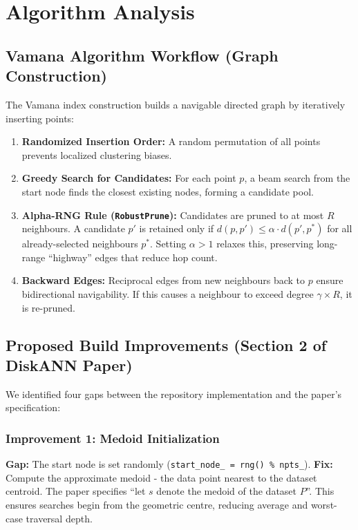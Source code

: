 \documentclass[10pt]{article}
\begin{document}
\section{Algorithm Analysis}

\subsection{Vamana Algorithm Workflow (Graph Construction)}

The Vamana index construction builds a navigable directed graph by iteratively inserting points:

\begin{enumerate}
    \item \textbf{Randomized Insertion Order:} A random permutation of all points prevents localized clustering biases.
    \item \textbf{Greedy Search for Candidates:} For each point $p$, a beam search from the start node finds the closest existing nodes, forming a candidate pool.
    \item \textbf{Alpha-RNG Rule (\texttt{RobustPrune}):} Candidates are pruned to at most $R$ neighbours. A candidate $p'$ is retained only if $d(p, p') \leq \alpha \cdot d(p', p^*)$ for all already-selected neighbours $p^*$. Setting $\alpha > 1$ relaxes this, preserving long-range ``highway'' edges that reduce hop count.
    \item \textbf{Backward Edges:} Reciprocal edges from new neighbours back to $p$ ensure bidirectional navigability. If this causes a neighbour to exceed degree $\gamma \times R$, it is re-pruned.
\end{enumerate}

\subsection{Proposed Build Improvements (Section 2 of DiskANN Paper)}

We identified four gaps between the repository implementation and the paper's specification:

\subsubsection{Improvement 1: Medoid Initialization}
\textbf{Gap:} The start node is set randomly (\texttt{start\_node\_ = rng() \% npts\_}). \textbf{Fix:} Compute the approximate medoid - the data point nearest to the dataset centroid. The paper specifies ``let $s$ denote the medoid of the dataset $P$''. This ensures searches begin from the geometric centre, reducing average and worst-case traversal depth.
\end{document}
